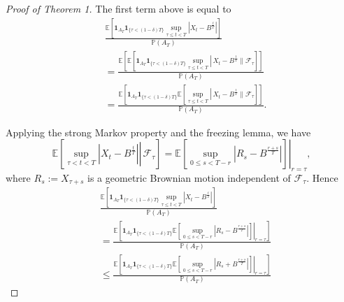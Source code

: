 \documentclass{article}
\theoremstyle{definition}
\theoremstyle{definition}
\begin{document}
\begin{proof}[Proof of Theorem 1]
The first term above is equal to
$$
\begin{aligned}
& \frac{\mathbb{E}\left[\mathbf{1}_{A_{T}} \mathbf{1}_{\{\tau<(1-\delta) T\}} \sup _{\tau \leq t<T}\left|X_{t}-B^{\frac{t}{T}}\right|\right]}{\mathbb{P}\left(A_{T}\right)} \\
& =\frac{\mathbb{E}\left[\mathbb{E}\left[\mathbf{1}_{A_{T}} \mathbf{1}_{\{\tau<(1-\delta) T\}} \sup _{\tau \leq t<T} \left\lvert\, X_{t}-B^{\frac{t}{T}}\right. \| \mathcal{F}_{\tau}\right]\right]}{\mathbb{P}\left(A_{T}\right)} \\
& =\frac{\mathbb{E}\left[\mathbf{1}_{A_{T}} \mathbf{1}_{\{\tau<(1-\delta) T\}} \mathbb{E}\left[\sup _{\tau \leq t<T} \left\lvert\, X_{t}-B^{\frac{t}{T}}\right. \| \mathcal{F}_{\tau}\right]\right]}{\mathbb{P}\left(A_{T}\right)} .
\end{aligned}
$$

Applying the strong Markov property and the freezing lemma, we have
$$
\mathbb{E}\left[\left.\sup _{\tau<t<T}\left|X_{t}-B^{\frac{t}{T}}\right| \right\rvert\, \mathcal{F}_{\tau}\right]=\left.\mathbb{E}\left[\sup _{0 \leq s<T-r}\left|R_{s}-B^{\frac{r+s}{T}}\right|\right]\right|_{r=\tau},
$$
where $R_{s}:=X_{\tau+s}$ is a geometric Brownian motion independent of $\mathcal{F}_{\tau}$. Hence
$$
\begin{aligned}
& \frac{\mathbb{E}\left[\mathbf{1}_{A_{T}} \mathbf{1}_{\{\tau<(1-\delta) T\}} \sup _{\tau \leq t<T}\left|X_{t}-B^{\frac{t}{T}}\right|\right]}{\mathbb{P}\left(A_{T}\right)} \\
& =\frac{\mathbb{E}\left[\left.\mathbf{1}_{A_{T}} \mathbf{1}_{\{\tau<(1-\delta) T\}} \mathbb{E}\left[\sup _{0 \leq s<T-r}\left|R_{s}-B^{\frac{r+s}{T}}\right|\right]\right|_{r=\tau}\right]}{\mathbb{P}\left(A_{T}\right)} \\
& \leq \frac{\mathbb{E}\left[\left.\mathbf{1}_{A_{T}} \mathbf{1}_{\{\tau<(1-\delta) T\}} \mathbb{E}\left[\sup _{0 \leq s<T-r}\left|R_{s}+B^{\frac{r+s}{T}}\right|\right]\right|_{r=\tau}\right]}{\mathbb{P}\left(A_{T}\right)}
\end{aligned}
$$


\end{proof}
\end{document}

